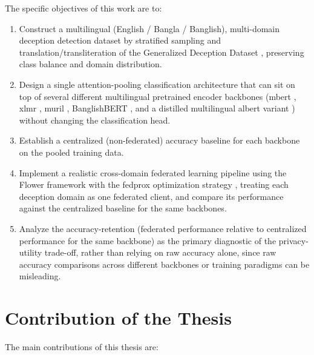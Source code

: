 The specific objectives of this work are to:
\begin{enumerate}
    \item Construct a multilingual (English / Bangla / Banglish), multi-domain deception detection dataset by stratified sampling and translation/transliteration of the Generalized Deception Dataset \cite{zeng2022generalized}, preserving class balance and domain distribution.
    \item Design a single attention-pooling classification architecture that can sit on top of several different multilingual pretrained encoder backbones (\gls{mbert} \cite{devlin2019bert}, \gls{xlmr} \cite{conneau2020xlmr}, \gls{muril} \cite{khanuja2021muril}, BanglishBERT \cite{bhattacharjee2022banglabert}, and a distilled multilingual \gls{albert} variant \cite{lan2020albert}) without changing the classification head.
    \item Establish a centralized (non-federated) accuracy baseline for each backbone on the pooled training data.
    \item Implement a realistic cross-domain federated learning pipeline using the Flower framework \cite{beutel2020flower} with the \gls{fedprox} optimization strategy \cite{li2020federated}, treating each deception domain as one federated client, and compare its performance against the centralized baseline for the same backbones.
    \item Analyze the accuracy-retention (federated performance relative to centralized performance for the same backbone) as the primary diagnostic of the privacy-utility trade-off, rather than relying on raw accuracy alone, since raw accuracy comparisons across different backbones or training paradigms can be misleading.
\end{enumerate}

\section{Contribution of the Thesis}

The main contributions of this thesis are:

